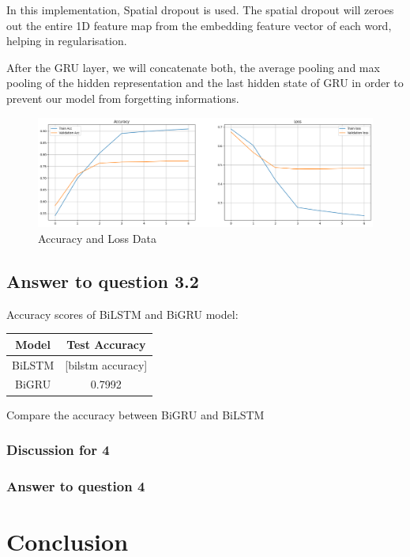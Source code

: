 \documentclass{article}
\begin{document}
In this implementation, Spatial dropout is used. The spatial dropout will zeroes out the entire 1D feature map from the embedding feature vector of each word, helping in regularisation. 

After the GRU layer, we will concatenate both, the average pooling and max pooling of the hidden representation and the last hidden state of GRU in order to prevent our model from forgetting informations. 
\begin{figure}
    \centering
    \includegraphics[width=1\linewidth]{BiGRU.png}
    \caption{Accuracy and Loss Data}
    \label{fig:enter-label}
\end{figure}

\subsection*{Answer to question 3.2}
Accuracy scores of BiLSTM and BiGRU model: 
\begin{center}
\begin{tabular}{ | c | c | }
\hline
 Model & Test Accuracy \\
\hline
 BiLSTM & [bilstm accuracy] \\
\hline
 BiGRU & 0.7992 \\
\hline
\end{tabular}
\end{center}

Compare the accuracy between BiGRU and BiLSTM

\subsubsection*{Discussion for 4}

\subsubsection*{Answer to question 4}

\section*{Conclusion}
\end{document}
